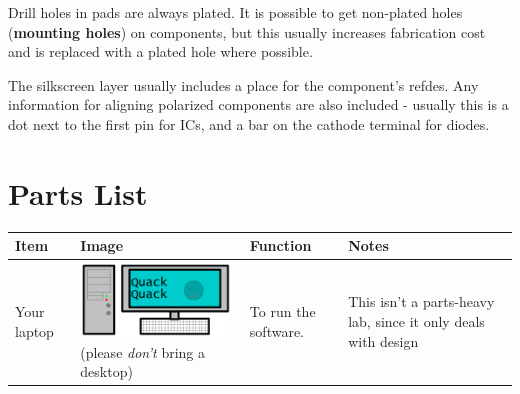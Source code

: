 \documentclass[letterpaper]{article}
\begin{document}
{\sffamily\color[rgb]{0.30980393,0.5058824,0.7411765}
Drill holes in pads are always plated. It is possible to get non-plated holes (\textbf{mounting holes}) on components,
but this usually increases fabrication cost and is replaced with a plated hole where possible.}

{\sffamily\color[rgb]{0.30980393,0.5058824,0.7411765}
The silkscreen layer usually includes a place for the component's refdes. Any information for aligning polarized
components are also included - usually this is a dot next to the first pin for ICs, and a bar on the cathode terminal
for diodes. }

\clearpage
\bigskip

\section{Parts List}
\hypertarget{Toc337742693}{}\begin{flushleft}
\tablefirsthead{}
\tablehead{}
\tabletail{}
\tablelasttail{}
\begin{supertabular}{|m{1.4247599in}|m{1.9212599in}|m{1.9212599in}|m{1.9247599in}|}
\hline
{\sffamily\bfseries\color[rgb]{0.30980393,0.5058824,0.7411765} Item} &
{\sffamily\bfseries\color[rgb]{0.30980393,0.5058824,0.7411765} Image} &
{\sffamily\color[rgb]{0.30980393,0.5058824,0.7411765} \textbf{Function}} &
{\sffamily\bfseries\color[rgb]{0.30980393,0.5058824,0.7411765} Notes}\\\hline
{\sffamily\color[rgb]{0.30980393,0.5058824,0.7411765} Your laptop} &
 \includegraphics[width=1.5728in,height=0.7909in]{figures/ee4document-img016.png} 
{\sffamily\color[rgb]{0.30980393,0.5058824,0.7411765} (please \textit{don't} bring a desktop)} &
{\sffamily\color[rgb]{0.30980393,0.5058824,0.7411765} To run the software.} &
{\sffamily\color[rgb]{0.30980393,0.5058824,0.7411765} This isn't a parts-heavy lab, since it
only deals with design}\\\hline
\end{supertabular}
\end{flushleft}
\end{document}
